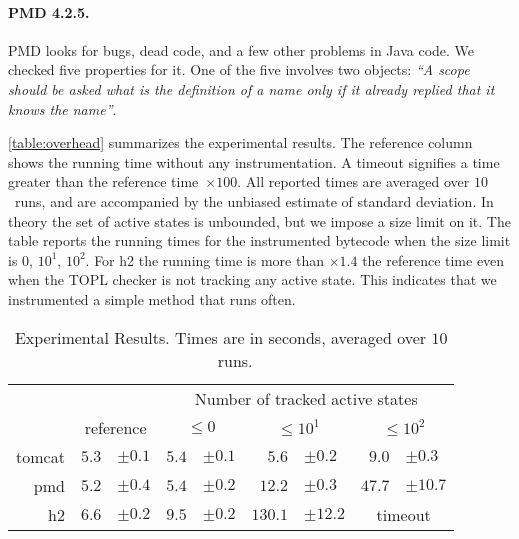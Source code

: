 \documentclass{article} %
\theoremstyle{definition}
\theoremstyle{remark}
\begin{document}
\paragraph{PMD 4.2.5.}
PMD looks for bugs, dead code, and a few other problems in Java code.
We checked five properties for it.
One of the five involves two objects:
{\em ``A scope should be asked what is the definition of a name only if it already replied that it knows the name''}.

\medskip
\autoref{table:overhead} summarizes the experimental results.
The reference column shows the running time without any instrumentation.
A timeout signifies a time greater than the reference time~$\times100$.
All reported times are averaged over $10$~runs, and are accompanied by the unbiased estimate of standard deviation.
In theory the set of active states is unbounded, but we impose a size limit on it.
The table reports the running times for the instrumented bytecode when the size limit is $0$, $10^1$, $10^2$.
For h2 the running time is more than $\times1.4$ the reference time even when the TOPL checker is not tracking any active state.
This indicates that we instrumented a simple method that runs often.

\begin{table}[t]\centering
\begin{tabular}{@{}rr@{}lr@{}lr@{}lr@{}l}
  &&
  & \multicolumn{6}{c}{Number of tracked active states} \\ \cmidrule{4-9}
& \multicolumn{2}{c}{reference}
  &\multicolumn{2}{c}{$\le0$}
  &\multicolumn{2}{c}{$\le10^1$}
  &\multicolumn{2}{c}{$\le10^2$}
\\ \midrule
tomcat
  & $5.3$ & $\pm0.1$
  & $5.4$ & $\pm0.1$
  & $5.6$ & $\pm0.2$
  & $9.0$ & $\pm0.3$
\\
pmd
  & $5.2$ & $\pm0.4$
  & $5.4$ & $\pm0.2$
  & $12.2$ & $\pm0.3$
  & $47.7$ & $\pm10.7$
  \\
h2
  & $6.6$ & $\pm0.2$
  & $9.5$ & $\pm0.2$
  & $130.1$ & $\pm12.2$
  & \multicolumn{2}{c}{timeout}
  \\
\end{tabular}
\caption{
  Experimental Results.
  Times are in seconds, averaged over $10$~runs.
}\label{table:overhead}
\end{table}
\end{document}
